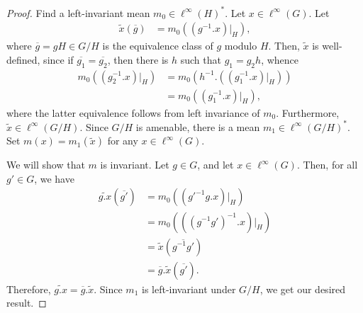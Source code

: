 \documentclass[10pt]{mypackage}
\begin{document}
\begin{proof}
  Find a left-invariant mean $m_0\in \ell^{\infty}\left( H \right)^{\ast}$. Let $ x\in \ell^{\infty}\left( G \right) $. Let
  \begin{align*}
    \widetilde{x}\left( \overline{g} \right) &= m_0\left( \left( g^{-1}.x \right)|_{H} \right),
  \end{align*}
  where $ \overline{g} = gH\in G/H $ is the equivalence class of $g$ modulo $H$. Then, $ \widetilde{x} $ is well-defined, since if $ \overline{g_1} = \overline{g_2} $, then there is $h$ such that $g_1 = g_2 h$, whence
  \begin{align*}
    m_0\left( \left( g_2^{-1}.x \right)|_{H} \right) &= m_0\left( h^{-1}.\left( \left( g_1^{-1}.x \right)|_{H} \right) \right)\\
                                                     &= m_0\left( \left( g_1^{-1}.x \right)|_{H} \right),
  \end{align*}
  where the latter equivalence follows from left invariance of $m_0$. Furthermore, $\widetilde{x}\in \ell^{\infty}\left( G/H \right)$. Since $G/H$ is amenable, there is a mean $m_1\in \ell^{\infty}\left( G/H \right)^{\ast}$. Set $m(x) = m_1\left( \widetilde{x} \right)$ for any $x\in \ell^{\infty}\left( G \right)$.

  We will show that $m$ is invariant. Let $g\in G$, and let $x\in\ell^{\infty}\left( G \right)$. Then, for all $g'\in G$, we have
  \begin{align*}
    \widetilde{g.x}\left( \overline{g'} \right) &= m_0\left( \left( g'^{-1}g.x \right)|_{H} \right)\\
                                                &= m_0\left( \left( \left( g^{-1}g' \right)^{-1}.x \right)|_{H} \right)\\
                                                &= \widetilde{x}\left( \overline{g^{-1}g'} \right)\\
                                                &= \overline{g}. \widetilde{x}\left( \overline{g'} \right).
  \end{align*}
  Therefore, $ \widetilde{g.x} = \overline{g}.\widetilde{x} $. Since $m_1$ is left-invariant under $G/H$, we get our desired result.
\end{proof}
\end{document}
